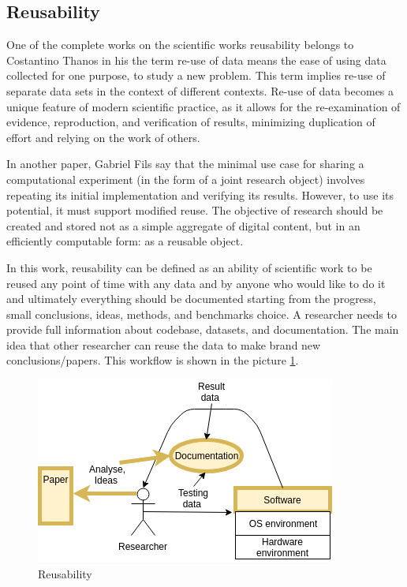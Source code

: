 \documentclass{vldb}
\begin{document}
\subsection{Reusability}
One of the complete works on the scientific works reusability belongs to Costantino Thanos\cite{DBLP:journals/publications/Thanos17} in his the term re-use of data means the ease of using data collected for one purpose, to study a new problem. This term implies re-use of separate data sets in the context of different contexts. Re-use of data becomes a unique feature of modern scientific practice, as it allows for the re-examination of evidence, reproduction, and verification of results, minimizing duplication of effort and relying on the work of others.\par 
In another paper, Gabriel Fils\cite{DBLP:journals/corr/ThatFYM17} say that the minimal use case for sharing a computational experiment (in the form of a joint research object) involves repeating its initial implementation and verifying its results. However, to use its potential, it must support modified reuse. The objective of research should be created and stored not as a simple aggregate of digital content, but in an efficiently computable form: as a reusable object.\par
In this work, reusability can be defined as an ability of scientific work to be reused any point of time with any data and by anyone who would like to do it and ultimately everything should be documented starting from the progress, small conclusions, ideas, methods, and benchmarks choice. A researcher needs to provide full information about codebase, datasets, and documentation. The main idea that other researcher can reuse the data to make brand new conclusions/papers. This workflow is shown in the picture \ref{fig:reusability}.\par
\begin{figure}[h!]
  \includegraphics[scale=0.6]{fig/reusability.png}
  \caption{Reusability}
  \label{fig:reusability}
\end{figure}
\end{document}
